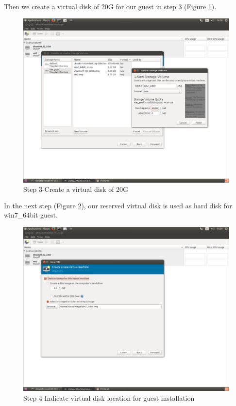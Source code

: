 Then we create a virtual disk of 20G for our guest in step 3 (Figure \ref{fig:Step 3-Create a virtual disk of 20G}).
\begin{figure}[htbp]
	\centering
		\includegraphics[scale=0.4]{Figures/Figure14.png}
	\caption[Step 3-Create a virtual disk of 20G]{Step 3-Create a virtual disk of 20G}
	\label{fig:Step 3-Create a virtual disk of 20G}
\end{figure}

In the next step (Figure \ref{fig:Step 4-Indicate virtual disk location for guest installation}), our reserved virtual disk is used as hard disk for win7\_64bit guest.
\begin{figure}[htbp]
	\centering
		\includegraphics[scale=0.4]{Figures/Figure15.png}
	\caption[Step 4-Indicate virtual disk location for guest installation]{Step 4-Indicate virtual disk location for guest installation}
	\label{fig:Step 4-Indicate virtual disk location for guest installation}
\end{figure}

